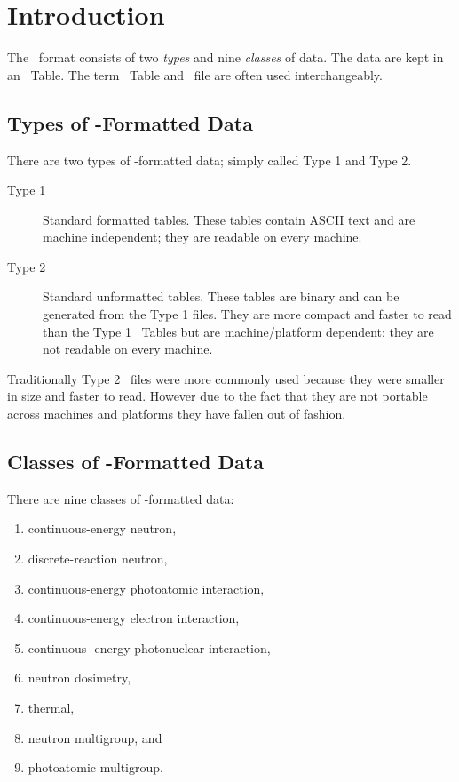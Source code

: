 \section{Introduction}\label{sec:Introduction}
The \ACE\ format consists of two \emph{types} and nine \emph{classes} of data. The data are kept in an \ACE\ Table. The term \ACE\ Table and \ACE\ file are often used interchangeably.

\subsection{Types of \ACE-Formatted Data}
There are two types of \ACE-formatted data; simply called Type 1 and Type 2.
\begin{description}
  \item[Type 1] Standard formatted tables. These tables contain ASCII text and are machine independent; they are readable on every machine. 
  \item[Type 2] Standard unformatted tables. These tables are binary and can be generated from the Type 1 files. They are more compact and faster to read than the Type 1 \ACE\ Tables
 but are machine/platform dependent; they are not readable on every machine. 
\end{description}
Traditionally
 Type 2 \ACE\ files were more commonly used because they were smaller in size and faster to read. However
 due to the fact that they are not portable across machines and platforms they have fallen out of fashion.

\subsection{Classes of \ACE-Formatted Data}
There are nine classes of \ACE-formatted data:
\begin{enumerate}
  \item continuous-energy neutron,
  \item discrete-reaction neutron,
  \item continuous-energy photoatomic interaction,
  \item continuous-energy electron interaction,
  \item continuous- energy photonuclear interaction,
  \item neutron dosimetry,
  \item \SaB thermal,
  \item neutron multigroup, and
  \item photoatomic multigroup.
\end{enumerate}

